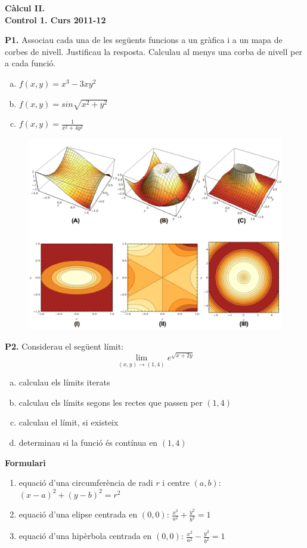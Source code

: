 \documentclass[12pt]{report}
\begin{document}
\begin{center}
\textbf{\Large Càlcul II.\\ Control 1. Curs 2011-12}
\end{center}

\vskip 0.3cm
\noindent
\textbf{P1.} Associau cada una de les següents funcions a un gràfica i a un mapa de corbes de nivell. Justificau
la resposta. Calculau al menys una corba de nivell per a cada funció.
\begin{enumerate}[a)]
\item $f(x, y)=x^3-3xy^2$
\item $f(x, y)=sin\sqrt{x^2+y^2}$
\item $f(x, y)=\frac{1}{x^2+4y^2}$
\end{enumerate}


\begin{figure}[htbp]
\begin{center}
\includegraphics[width=12cm]{figura1.png}
\end{center}
\end{figure}

\vskip 0.3cm
\noindent
\textbf{P2.} Considerau el següent límit:
\[
\lim_{(x, y) \rightarrow (1, 4)} e^{\sqrt{x+2y}}
\]

\begin{enumerate}[a)]
\item calculau els límits iterats
\item calculau els límits segons les rectes que passen per $(1, 4)$
\item calculau el límit, si existeix
\item determinau si la funció és contínua en $(1, 4)$
\end{enumerate} 



\vskip 0.8cm
\noindent
\textbf{Formulari}

\begin{enumerate}
\item equació d'una circumferència de radi $r$ i centre $(a, b)$: $(x-a)^2+(y-b)^2=r^2$
\item equació d'una elipse centrada en $(0, 0)$: $\frac{x^2}{a^2}+\frac{y^2}{b^2}=1$
\item equació d'una hipèrbola centrada en $(0, 0)$: $\frac{x^2}{a^2}-\frac{y^2}{b^2}=1$
\end{enumerate}
\end{document}
